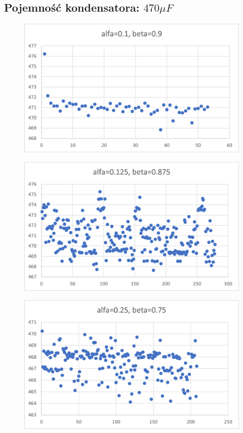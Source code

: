 \documentclass[12pt]{mwart}
\begin{document}
	\subsection{Pojemność kondensatora: $470 \mu F$}
	\begin{figure}[H]
		\centering
		\includegraphics{470_a0.1.png}
	\end{figure}
	\begin{figure}[H]
		\centering
		\includegraphics{470_a0.125.png}
	\end{figure}
	\begin{figure}[H]
		\centering
		\includegraphics{470_a0.25.png}
	\end{figure}
\end{document}
